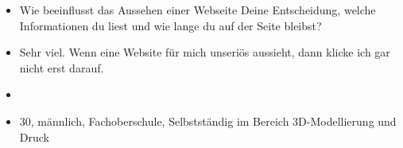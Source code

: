 {\begin{itemize}[]
                  Man sieht gut wie Artikel zusammenhängen und diese Möglichkeit gibt es bei der Liste nicht.
            \item {} Wie beeinflusst das Aussehen einer Webseite Deine Entscheidung, welche Informationen du liest und wie lange du auf der Seite bleibst?
            \item {} Sehr viel.
                  Wenn eine Website für mich unseriös aussieht, dann klicke ich gar nicht erst darauf.
            \item {}
            \item {} 30, männlich, Fachoberschule, Selbstständig im Bereich 3D-Modellierung und Druck
      \end{itemize}}
\nolinenumbers
